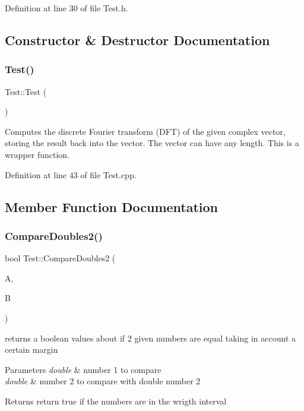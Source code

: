 Definition at line 30 of file Test.\+h.



\subsection{Constructor \& Destructor Documentation}
\mbox{\label{class_test_a99f2bbfac6c95612322b0f10e607ebe5}} 
\subsubsection{\texorpdfstring{Test()}{Test()}}
{\footnotesize\ttfamily Test\+::\+Test (\begin{DoxyParamCaption}{ }\end{DoxyParamCaption})}



Computes the discrete Fourier transform (D\+FT) of the given complex vector, storing the result back into the vector. The vector can have any length. This is a wrapper function. 



Definition at line 43 of file Test.\+cpp.



\subsection{Member Function Documentation}
\mbox{\label{class_test_a22627e262a5cace5c5608c9dae4febff}} 
\subsubsection{\texorpdfstring{Compare\+Doubles2()}{CompareDoubles2()}}
{\footnotesize\ttfamily bool Test\+::\+Compare\+Doubles2 (\begin{DoxyParamCaption}\item[{double const \&}]{A,  }\item[{double const \&}]{B }\end{DoxyParamCaption})}



returns a boolean values about if 2 given numbers are equal taking in account a certain margin 


\begin{DoxyParams}{Parameters}
{\em double} & number 1 to compare \\
\hline
{\em double} & number 2 to compare with double number 2 \\
\hline
\end{DoxyParams}
\begin{DoxyReturn}{Returns}
return true if the numbers are in the wrigth interval 
\end{DoxyReturn}


